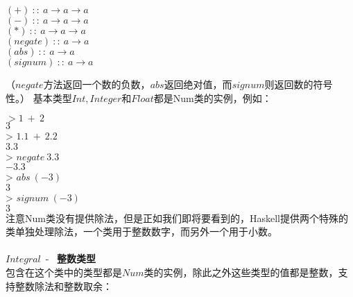 \noindent\hspace*{1cm} $(+)~::~a \rightarrow a \rightarrow a$\\
\hspace*{1cm} $(-)~::~a \rightarrow a \rightarrow a$\\
\hspace*{1cm} $(*)~::~a \rightarrow a \rightarrow a$\\
\hspace*{1cm} $(negate)~::~a \rightarrow  a$\\
\hspace*{1cm} $(abs)~::~a \rightarrow  a$\\
\hspace*{1cm} $(signum)~::~a \rightarrow a$

（$negate$方法返回一个数的负数，$abs$返回绝对值，而$signum$则返回数的符号性。）
基本类型$Int, Integer$和$Float$都是Num类的实例，例如：

\noindent\hspace*{1cm} $> 1~+~2$\\
\hspace*{1cm} $3$\\

\noindent\hspace*{1cm} > $1.1~+~2.2$\\
\hspace*{1cm} $3.3$\\

\noindent\hspace*{1cm} > $negate~3.3$\\
\hspace*{1cm} $-3.3$\\

\noindent\hspace*{1cm} > $abs~(-3)$\\
\hspace*{1cm} $3$\\

\noindent\hspace*{1cm} > $signum~(-3)$\\
\hspace*{1cm} $3$\\

注意Num类没有提供除法，但是正如我们即将要看到的，Haskell提供两个特殊的类单独处理除法，一个类用于整数数字，而另外一个用于小数。
\\
\\
\noindent$Integral$~-~ \textbf{整数类型}\\
包含在这个类中的类型都是$Num$类的实例，除此之外这些类型的值都是整数，支持整数除法和整数取余：

